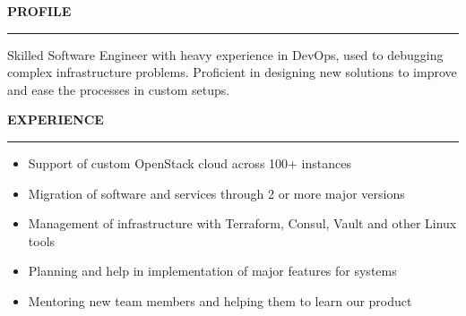 \documentclass[12pt,a4paper,ragged2e]{altacv}
\renewcommand{\cvsection}[2][]{%
    \bigskip%
    \ifstrequal{#1}{}{}{\marginpar{\vspace*{\dimexpr1pt-\baselineskip}\raggedright}}%
    {\color{heading}\bfseries\MakeUppercase{#2}}\\[-1ex]%
    {\color{heading}\rule{\linewidth}{2pt}\par}\medskip
  }
\begin{document}



\begin{fullwidth}
\makecvheader
\end{fullwidth}



\cvsection[p1sidebar]{Profile}

Skilled Software Engineer with heavy experience in DevOps, used to debugging complex infrastructure problems. Proficient in designing new solutions to improve and ease the processes in custom setups.

\cvsection{Experience}

\begin{itemize}
\item Support of custom OpenStack cloud across 100+ instances
\item Migration of software and services through 2 or more major versions
\item Management of infrastructure with Terraform, Consul, Vault and other Linux tools
\item Planning and help in implementation of major features for systems
\item Mentoring new team members and helping them to learn our product
\end{itemize}
\end{document}
